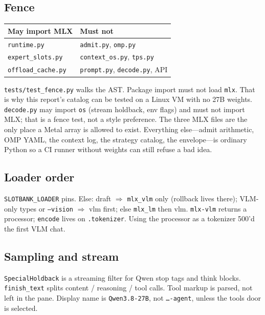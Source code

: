 \subsection{Fence}

\begin{center}
\begin{tabular}{@{}ll@{}}
\toprule
May import MLX & Must not \\
\midrule
\texttt{runtime.py} & \texttt{admit.py}, \texttt{omp.py} \\
\texttt{expert\_slots.py} & \texttt{context\_os.py}, \texttt{tps.py} \\
\texttt{offload\_cache.py} & \texttt{prompt.py}, \texttt{decode.py}, API \\
\bottomrule
\end{tabular}
\end{center}

\texttt{tests/test\_fence.py} walks the AST. Package import must not load \texttt{mlx}. That is why this report's catalog can be tested on a Linux VM with no 27B weights. \texttt{decode.py} may import \texttt{os} (stream holdback, env flags) and must not import MLX; that is a fence test, not a style preference. The three MLX files are the only place a Metal array is allowed to exist. Everything else---admit arithmetic, OMP YAML, the context log, the strategy catalog, the envelope---is ordinary Python so a CI runner without weights can still refuse a bad idea.

\subsection{Loader order}

\texttt{SLOTBANK\_LOADER} pins. Else: draft $\Rightarrow$ \texttt{mlx\_vlm} only (rollback lives there); VLM-only types or \texttt{--vision} $\Rightarrow$ vlm first; else \texttt{mlx\_lm} then vlm. \texttt{mlx-vlm} returns a processor; \texttt{encode} lives on \texttt{.tokenizer}. Using the processor as a tokenizer 500'd the first VLM chat.

\subsection{Sampling and stream}

\texttt{SpecialHoldback} is a streaming filter for Qwen stop tags and think blocks. \texttt{finish\_text} splits content / reasoning / tool calls. Tool markup is parsed, not left in the pane. Display name is \texttt{Qwen3.8-27B}, not \texttt{\ldots-agent}, unless the tools door is selected.


